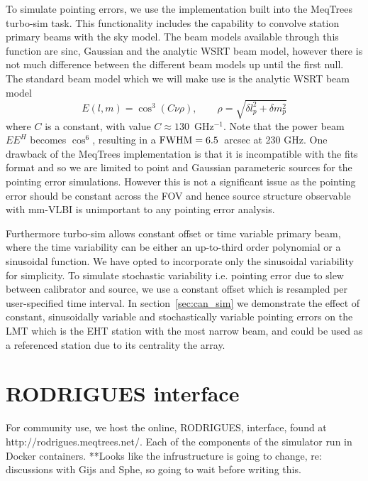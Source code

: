 To simulate pointing errors, we use the implementation built into the {\sc MeqTrees} turbo-sim task. This functionality includes the capability to convolve station primary beams with the sky model. The beam models available through this function are sinc, Gaussian and the analytic WSRT beam model, however there is not much difference between the different beam models up until the first null. The standard beam model which we will make use  is the analytic WSRT beam model \citep{Popping_2008} 
\begin{equation}\label{eq:wsrt_beam}
E(l, m) = \cos^3(C\nu \rho),\qquad   \rho = \sqrt{\delta l_p^2 + \delta m_p^2}
\end{equation}
where $C$ is a constant, with value $C \approx 130$~GHz$^{-1}$. Note that the power beam $EE^H$ becomes $\cos^6$, resulting in a $\rm{FWHM} = 6.5 $~arcsec at 230 GHz.  One drawback of the {\sc MeqTrees} implementation is that it is incompatible with the {\sc fits} format and so we are limited to point and Gaussian parameteric sources for the pointing error simulations. However this is not a significant issue as the pointing error should be constant across the FOV and hence source structure observable with mm-VLBI is unimportant to any pointing error analysis.

Furthermore turbo-sim allows constant offset or time variable primary beam, where the time variability can be either an up-to-third order polynomial or a sinusoidal function. We have opted to incorporate only the sinusoidal variability for simplicity. To simulate stochastic variability i.e. pointing error due to slew between calibrator and source, we use a constant offset which is resampled per user-specified time interval. In section~\ref{sec:can_sim} we demonstrate the effect of constant, sinusoidally variable and stochastically variable pointing errors on the LMT which is the EHT station with the most narrow beam, and could be used as a referenced station due to its centrality the array.


\section{RODRIGUES interface}
For community use, we host the online, RODRIGUES, interface, found at http://rodrigues.meqtrees.net/. Each of the components of the simulator run in Docker containers. **Looks like the infrustructure is going to change, re: discussions with Gijs and Sphe, so going to wait before writing this.
